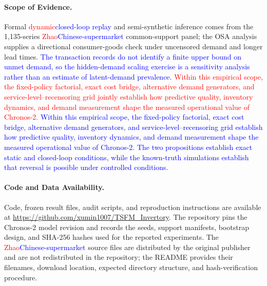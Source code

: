 \documentclass[msom,dblanonrev]{informs4}
\newcommand{\add}[1]{\textcolor{blue}{#1}}
\newcommand{\reduce}[1]{\textcolor{red}{#1}\hspace{0.5em}}
\begin{document}
\paragraph{Scope of Evidence.}
Formal \reduce{dynamic}\add{closed-loop replay} and semi-synthetic inference comes from the 1{,}135-series \reduce{Zhao}\add{Chinese-supermarket} common-support panel; the OSA analysis supplies a directional consumer-goods check under uncensored demand and longer lead times.
\add{The transaction records do not identify a finite upper bound on unmet demand, so the hidden-demand scaling exercise is a sensitivity analysis rather than an estimate of latent-demand prevalence.}
\reduce{Within this empirical scope, the fixed-policy factorial, exact cost bridge, alternative demand generators, and service-level--recensoring grid jointly establish how predictive quality, inventory dynamics, and demand measurement shape the measured operational value of Chronos-2.}
\add{Within this empirical scope, the fixed-policy factorial, exact cost bridge, alternative demand generators, and service-level--recensoring grid establish how predictive quality, inventory dynamics, and demand measurement shape the measured operational value of Chronos-2. The two propositions establish exact static and closed-loop conditions, while the known-truth simulations establish that reversal is possible under controlled conditions.}

\paragraph{Code and Data Availability.}
Code, frozen result files, audit scripts, and reproduction instructions are available at
\url{https://github.com/xumin1007/TSFM_Invertory}.
The repository pins the Chronos-2 model revision and records the seeds, support manifests, bootstrap design, and SHA-256 hashes used for the reported experiments.
The \reduce{Zhao}\add{Chinese-supermarket} source files are distributed by the original publisher and are not redistributed in the repository; the README provides their filenames, download location, expected directory structure, and hash-verification procedure.








\end{document}
